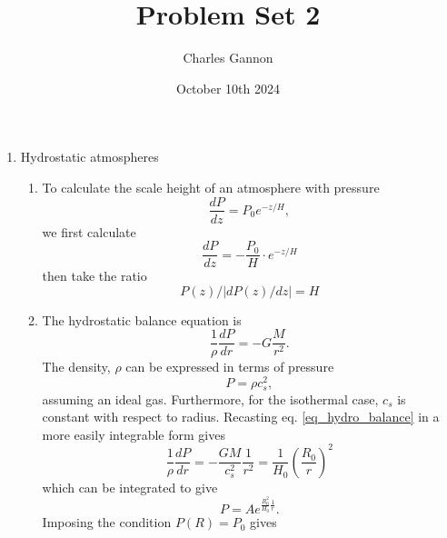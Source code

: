 \documentclass{article}
\title{Problem Set 2}
\date{October 10th 2024}
\author{Charles Gannon}
\begin{document}
  \maketitle
  \begin{enumerate}
    \item Hydrostatic atmospheres
    \begin{enumerate}
        \item 
            To calculate the scale height of an atmosphere with pressure
            \begin{equation}
                \frac{dP}{dz} =  P_0 e^{-z / H},
            \end{equation}
            we first calculate
            \begin{equation}
                \frac{dP}{dz} =  - \frac{P_0}{H} \cdot e^{-z / H}
            \end{equation}
            then take the ratio
            \begin{equation}
                P(z) / \left| dP(z)/dz \right| = H
            \end{equation}
        \item
            The hydrostatic balance equation is
            \begin{equation}\label{eq_hydro_balance}
                \frac{1}{\rho} \frac{dP}{dr} = -G \frac{M}{r^2}.
            \end{equation}
            The density, $\rho$ can be expressed in terms of pressure
            \begin{equation}
                P = \rho c_s^2,
            \end{equation}
            assuming an ideal gas.
            Furthermore, for the isothermal case, $c_s$ is constant with respect to radius.
            Recasting eq. \ref{eq_hydro_balance} in a more easily integrable form gives 
            \begin{equation}
                \frac{1}{\rho} \frac{dP}{dr} = -\frac{G M}{c_s^2} \frac{1}{r^2} = \frac{1}{H_0} \left( \frac{R_0}{r} \right)^2
            \end{equation}
            which can be integrated to give
            \begin{equation}
                P = A e^{\frac{R_0^2}{H_0} \frac{1}{r}}.
            \end{equation}
            Imposing the condition $P(R) = P_0$ gives 
            \begin{equation}\label{eq_pshere}

\end{equation}
\end{enumerate}
\end{enumerate}
\end{document}
